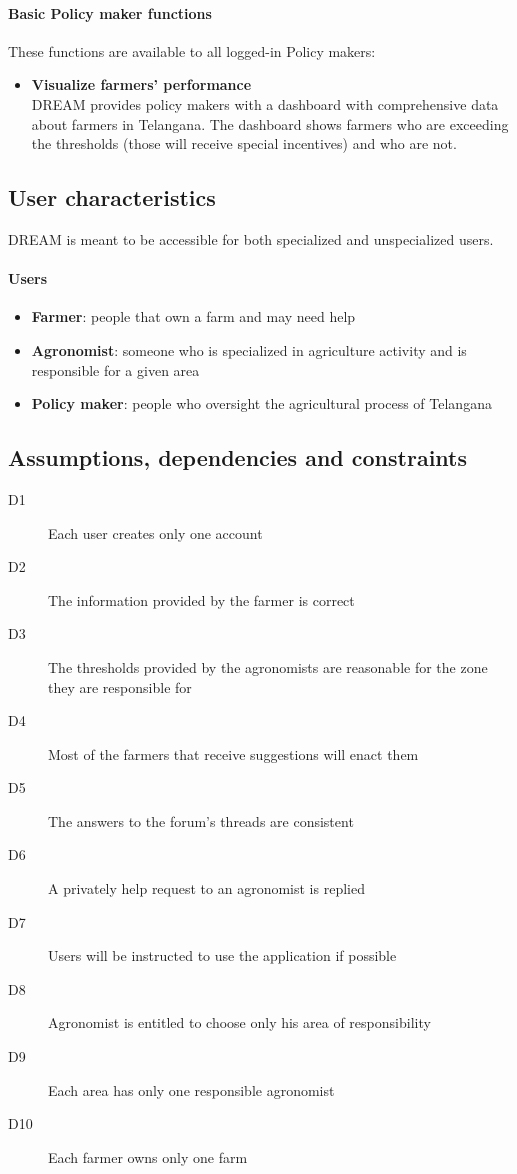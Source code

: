 \paragraph{Basic Policy maker functions} These functions are available to all logged-in Policy makers:
\begin{itemize}
    \item \textbf{Visualize farmers' performance}\\
    DREAM provides policy makers with a dashboard with comprehensive data about farmers in Telangana.
    The dashboard shows farmers who are exceeding the thresholds (those will receive special incentives)
    and who are not.
\end{itemize}

\newpage
\subsection{User characteristics}

DREAM is meant to be accessible for both specialized and unspecialized users.

\paragraph{Users}
\begin{itemize}
    \item \textbf{Farmer}: people that own a farm and may need help
    \item \textbf{Agronomist}: someone who is specialized in agriculture activity and is responsible for a given area
    \item \textbf{Policy maker}: people who oversight the agricultural process of Telangana
\end{itemize}

\bigskip
\subsection{Assumptions, dependencies and constraints}
\begin{description}
    \item[D1] Each user creates only one account
    \item[D2] The information provided by the farmer is correct
    \item[D3] The thresholds provided by the agronomists are reasonable for the zone they are responsible for
    \item[D4] Most of the farmers that receive suggestions will enact them
    \item[D5] The answers to the forum's threads are consistent
    \item[D6] A privately help request to an agronomist is replied
    \item[D7] Users will be instructed to use the application if possible
    \item[D8] Agronomist is entitled to choose only his area of responsibility
    \item[D9] Each area has only one responsible agronomist 
    \item[D10] Each farmer owns only one farm 
\end{description}